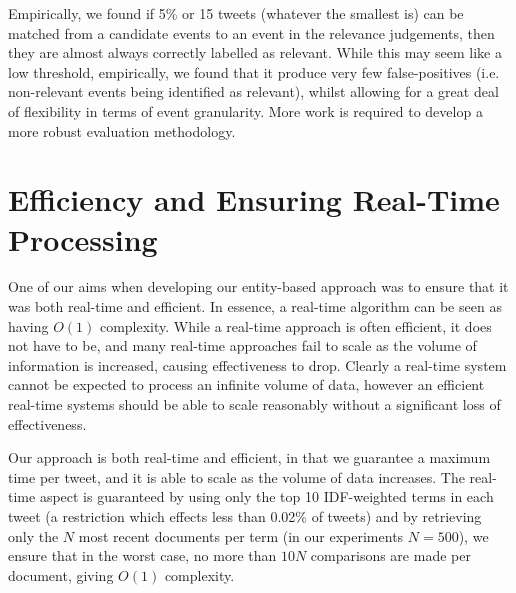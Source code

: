 Empirically, we found if 5\% or 15 tweets (whatever the smallest is) can be matched from a candidate events to an event in the relevance judgements, then they are almost always correctly labelled as relevant.
While this may seem like a low threshold, empirically, we found that it produce very few false-positives (i.e. non-relevant events being identified as relevant), whilst allowing for a great deal of flexibility in terms of event granularity.
More work is required to develop a more robust evaluation methodology.

\section{Efficiency and Ensuring Real-Time Processing}
One of our aims when developing our entity-based approach was to ensure that it was both real-time and efficient. In essence, a real-time algorithm can be seen as having \(O(1)\) complexity. While a real-time approach is often efficient, it does not have to be, and many real-time approaches fail to scale as the volume of information is increased, causing effectiveness to drop. Clearly a real-time system cannot be expected to process an infinite volume of data, however an efficient real-time systems should be able to scale reasonably without a significant loss of effectiveness.

Our approach is both real-time and efficient, in that we guarantee a maximum time per tweet, and it is able to scale as the volume of data increases.
The real-time aspect is guaranteed by using only the top 10 IDF-weighted terms in each tweet (a restriction which effects less than 0.02\% of tweets) and by retrieving only the \(N\) most recent documents per term (in our experiments \(N = 500\)), we ensure that in the worst case, no more than \(10N\) comparisons are made per document, giving \(O(1)\) complexity.

